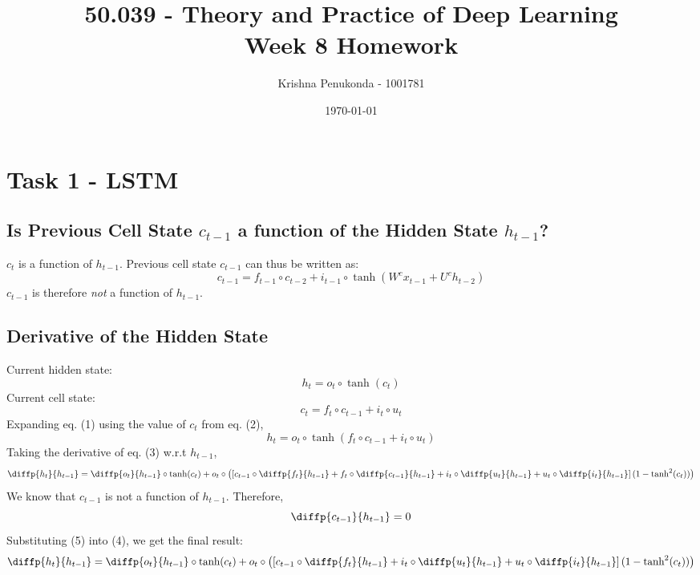 \documentclass[9pt]{paper}
\title{
	50.039 -  Theory and Practice of Deep Learning\\
	Week 8 Homework
}
\author{Krishna Penukonda - 1001781}
\date{\today}
\begin{document}
\maketitle

\section{Task 1 - LSTM}

\subsection{Is Previous Cell State $c_{t-1}$ a function of the Hidden State $h_{t-1}$?}
$c_t$ is a function of $h_{t-1}$.
Previous cell state $c_{t-1}$ can thus be written as:
\begin{equation*}
	c_{t-1} = f_{t-1} \circ c_{t - 2} + i_{t-1} \circ \tanh(W^c x_{t-1} + U^c h_{t - 2})
\end{equation*}
$c_{t-1}$ is therefore \emph{not} a function of $h_{t-1}$.

\subsection{Derivative of the Hidden State}
Current hidden state:
\begin{equation}
	h_t = o_t \circ \tanh(c_t)
\end{equation}
Current cell state:
\begin{equation}
	c_t = f_t \circ c_{t-1} + i_t \circ u_t
\end{equation}
Expanding eq. (1) using the value of $c_t$ from eq. (2),
\begin{equation}
	h_t = o_t \circ \tanh(f_t \circ c_{t-1} + i_t \circ u_t)
\end{equation}
Taking the derivative of eq. (3) w.r.t $h_{t-1}$,
\begin{equation}
    \diffp{h_t}{{h_{t-1}}} = \diffp{o_t}{{h_{t-1}}} \circ \tanh(c_t) + \\
    o_t \circ \left( \left[
        c_{t-1} \circ \diffp{f_t}{{h_{t-1}}} +
        f_t \circ \diffp{{c_{t-1}}}{{h_{t-1}}} +
        i_t \circ \diffp{u_t}{{h_{t-1}}} +
        u_t \circ \diffp{i_t}{{h_{t-1}}}
    \right] (1 - \tanh^2(c_t)) \right)
\end{equation}
We know that $c_{t-1}$ is not a function of $h_{t-1}$. Therefore,
\begin{equation}
	\diffp{{c_{t-1}}}{{h_{t-1}}} = 0
\end{equation}
Substituting (5) into (4), we get the final result:
\begin{equation*}
	\diffp{h_t}{{h_{t-1}}} = \diffp{o_t}{{h_{t-1}}} \circ \tanh(c_t) + \\
	o_t \circ \left( \left[
		c_{t-1} \circ \diffp{f_t}{{h_{t-1}}} +
		i_t \circ \diffp{u_t}{{h_{t-1}}} +
		u_t \circ \diffp{i_t}{{h_{t-1}}}
	\right] (1 - \tanh^2(c_t)) \right)
\end{equation*}
\end{document}
